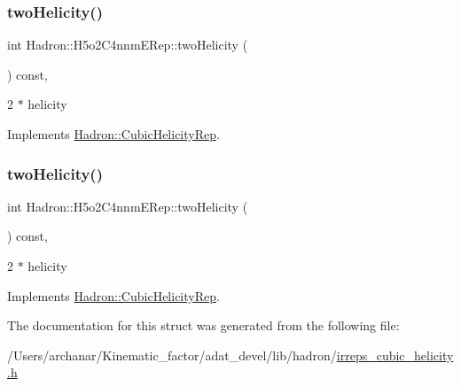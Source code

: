 \subsubsection{\texorpdfstring{twoHelicity()}{twoHelicity()}\hspace{0.1cm}{\footnotesize\ttfamily [1/2]}}
{\footnotesize\ttfamily int Hadron\+::\+H5o2\+C4nnm\+E\+Rep\+::two\+Helicity (\begin{DoxyParamCaption}{ }\end{DoxyParamCaption}) const\hspace{0.3cm}{\ttfamily [inline]}, {\ttfamily [virtual]}}

2 $\ast$ helicity 

Implements \mbox{\hyperlink{structHadron_1_1CubicHelicityRep_af507aa56fc2747eacc8cb6c96db31ecc}{Hadron\+::\+Cubic\+Helicity\+Rep}}.

\mbox{\label{structHadron_1_1H5o2C4nnmERep_a5b15b3ef270c38266d305dfec412684d}} 
\subsubsection{\texorpdfstring{twoHelicity()}{twoHelicity()}\hspace{0.1cm}{\footnotesize\ttfamily [2/2]}}
{\footnotesize\ttfamily int Hadron\+::\+H5o2\+C4nnm\+E\+Rep\+::two\+Helicity (\begin{DoxyParamCaption}{ }\end{DoxyParamCaption}) const\hspace{0.3cm}{\ttfamily [inline]}, {\ttfamily [virtual]}}

2 $\ast$ helicity 

Implements \mbox{\hyperlink{structHadron_1_1CubicHelicityRep_af507aa56fc2747eacc8cb6c96db31ecc}{Hadron\+::\+Cubic\+Helicity\+Rep}}.



The documentation for this struct was generated from the following file\+:\begin{DoxyCompactItemize}
\item 
/\+Users/archanar/\+Kinematic\+\_\+factor/adat\+\_\+devel/lib/hadron/\mbox{\hyperlink{lib_2hadron_2irreps__cubic__helicity_8h}{irreps\+\_\+cubic\+\_\+helicity.\+h}}\end{DoxyCompactItemize}
